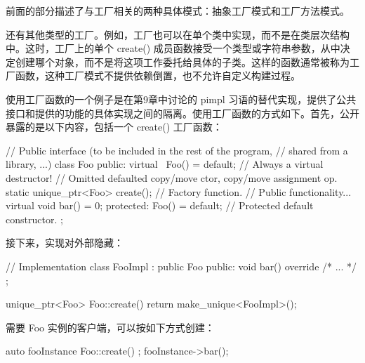 前面的部分描述了与工厂相关的两种具体模式：抽象工厂模式和工厂方法模式。

还有其他类型的工厂。例如，工厂也可以在单个类中实现，而不是在类层次结构中。这时，工厂上的单个 create() 成员函数接受一个类型或字符串参数，从中决定创建哪个对象，而不是将这项工作委托给具体的子类。这样的函数通常被称为工厂函数，这种工厂模式不提供依赖倒置，也不允许自定义构建过程。

使用工厂函数的一个例子是在第9章中讨论的 pimpl 习语的替代实现，提供了公共接口和提供的功能的具体实现之间的隔离。使用工厂函数的方式如下。首先，公开暴露的是以下内容，包括一个 create() 工厂函数：

\begin{cpp}
// Public interface (to be included in the rest of the program,
// shared from a library, ...)
class Foo
{
    public:
        virtual ~Foo() = default; // Always a virtual destructor!
        // Omitted defaulted copy/move ctor, copy/move assignment op.
        static unique_ptr<Foo> create(); // Factory function.
        // Public functionality...
        virtual void bar() = 0;
    protected:
        Foo() = default; // Protected default constructor.
};
\end{cpp}

接下来，实现对外部隐藏：

\begin{cpp}
// Implementation
class FooImpl : public Foo
{
    public:
    void bar() override { /* ... */ }
};

unique_ptr<Foo> Foo::create()
{
    return make_unique<FooImpl>();
}
\end{cpp}

需要 Foo 实例的客户端，可以按如下方式创建：

\begin{cpp}
auto fooInstance { Foo::create() };
fooInstance->bar();
\end{cpp}
